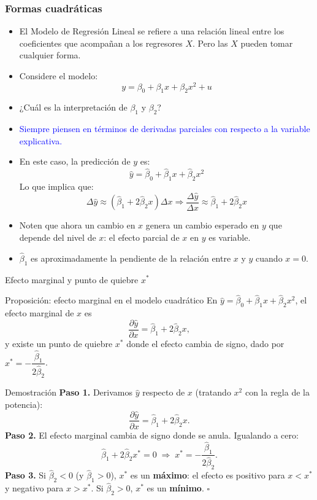 \documentclass{beamer}
\begin{document}
\begin{frame}[shrink=10]
\frametitle{Formas cuadráticas}

\begin{itemize}
    \item El Modelo de Regresión Lineal se refiere a una relación lineal entre los coeficientes que acompañan a los regresores $X$. Pero las $X$ pueden tomar cualquier forma.
    \item Considere el modelo:
    \[
    y = \beta_0 + \beta_1 x + \beta_2 x^2 + u
    \]
    \item ¿Cuál es la interpretación de $\beta_1$ y $\beta_2$?
    \item \textcolor{blue}{Siempre piensen en términos de derivadas parciales con respecto a la variable explicativa.}
    \item En este caso, la predicción de $y$ es:
    \[
    \hat{y} = \hat{\beta}_0 + \hat{\beta}_1 x + \hat{\beta}_2 x^2
    \]
    Lo que implica que:
    \[
    \Delta \hat{y} \approx (\hat{\beta}_1 + 2 \hat{\beta}_2 x) \Delta x \Rightarrow \frac{\Delta \hat{y}}{\Delta x} \approx \hat{\beta}_1 + 2 \hat{\beta}_2 x
    \]
    \item Noten que ahora un cambio en $x$ genera un cambio esperado en $y$ que depende del nivel de $x$: el efecto parcial de $x$ en $y$ es variable.
    \item $\hat{\beta}_1$ es aproximadamente la pendiente de la relación entre $x$ y $y$ cuando $x = 0$.
\end{itemize}

\end{frame}

\begin{frame}{Efecto marginal y punto de quiebre $x^*$}

\begin{alertblock}{Proposición: efecto marginal en el modelo cuadrático}
En $\hat{y} = \hat{\beta}_0 + \hat{\beta}_1 x + \hat{\beta}_2 x^2$, el efecto marginal de $x$ es
\[
\frac{\partial \hat{y}}{\partial x} = \hat{\beta}_1 + 2\hat{\beta}_2 x,
\]
y existe un punto de quiebre $x^*$ donde el efecto cambia de signo, dado por $x^* = -\dfrac{\hat{\beta}_1}{2\hat{\beta}_2}$.
\end{alertblock}

\begin{exampleblock}{Demostración}
\textbf{Paso 1.} Derivamos $\hat{y}$ respecto de $x$ (tratando $x^2$ con la regla de la potencia):
\[
\frac{\partial \hat{y}}{\partial x} = \hat{\beta}_1 + 2\hat{\beta}_2 x .
\]
\textbf{Paso 2.} El efecto marginal cambia de signo donde se anula. Igualando a cero:
\[
\hat{\beta}_1 + 2\hat{\beta}_2 x^* = 0 \;\Longrightarrow\; x^* = -\frac{\hat{\beta}_1}{2\hat{\beta}_2}.
\]
\textbf{Paso 3.} Si $\hat{\beta}_2 < 0$ (y $\hat{\beta}_1>0$), $x^*$ es un \textbf{máximo}: el efecto es positivo para $x<x^*$ y negativo para $x>x^*$. Si $\hat{\beta}_2>0$, $x^*$ es un \textbf{mínimo}. \hfill $\square$
\end{exampleblock}

\end{frame}
\end{document}
